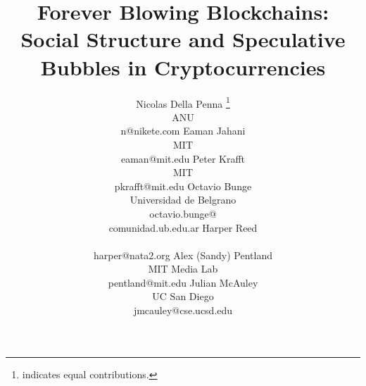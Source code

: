\documentclass[letterpaper]{article}
\begin{document}
%
\title{Forever Blowing Blockchains: Social Structure and Speculative Bubbles in Cryptocurrencies}
\author{
%
%
Nicolas Della Penna \thanks{indicates equal contributions.}\\
ANU \\
n@nikete.com
\And
Eaman Jahani \footnotemark[1] \\
MIT \\
eaman@mit.edu
\And
Peter Krafft \\%
MIT \\
pkrafft@mit.edu
\And
Octavio Bunge \\%
Universidad de Belgrano \\
octavio.bunge@\\comunidad.ub.edu.ar
\AND
Harper Reed \\%
\\
harper@nata2.org
\And  %
Alex (Sandy) Pentland \\ %
MIT Media Lab \\
pentland@mit.edu
\And
Julian McAuley \\%
UC San Diego \\
jmcauley@cse.ucsd.edu
}
\maketitle
\end{document}

